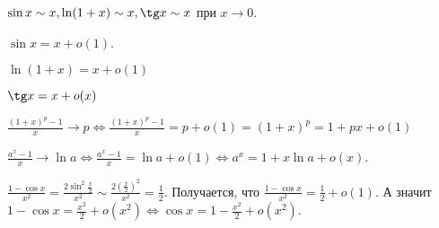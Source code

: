\begin{example}
    $\sin x \sim x, \ln(1+x) \sim x, \tg x \sim x$ при $x \to 0$.
\end{example}
\begin{example}
    $\sin x = x + o(1)$.

    $\ln(1+x) = x + o(1)$
    
    $\tg x = x + o(x)$ 

    $\frac{(1+x)^p - 1}{x} \to p \iff \frac{(1+x)^p - 1}{x} = p+o(1) = (1+x)^p = 1 + px + o(1)$ 

    $\frac{a^x - 1}{x} \to \ln a \iff \frac{a^x - 1}{x} = \ln a + o(1) \iff a^x = 1 + x \ln a + o(x)$.

    $\frac{1-\cos x}{x^2} = \frac{2\sin^2 \frac{x}{2}}{x^2} \sim \frac{2\left(\frac{x}{2}\right)^2}{x^2} = \frac{1}{2}$. Получается, что $\frac{1 - \cos x}{x^2} = \frac{1}{2} + o(1)$. А значит $1-\cos x = \frac{x^2}{2} + o(x^2) \iff \cos x = 1 - \frac{x^2}{2} + o(x^2)$.
\end{example}
